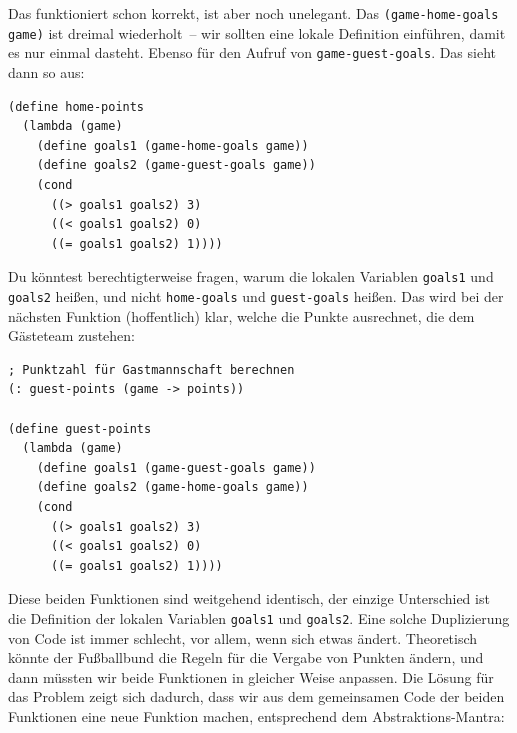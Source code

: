 %
Das funktioniert schon korrekt, ist aber noch unelegant.
Das \lstinline{(game-home-goals game)} ist dreimal wiederholt~-- wir
sollten eine lokale Definition einführen, damit es nur einmal
dasteht.  Ebenso für den Aufruf von \lstinline{game-guest-goals}.  Das
sieht dann so aus:\label{func:home-points}
%
\begin{lstlisting}
(define home-points
  (lambda (game)
    (define goals1 (game-home-goals game))
    (define goals2 (game-guest-goals game))
    (cond
      ((> goals1 goals2) 3)
      ((< goals1 goals2) 0)
      ((= goals1 goals2) 1))))
\end{lstlisting}
%
Du könntest berechtigterweise fragen, warum die lokalen Variablen
\lstinline{goals1} und \lstinline{goals2} heißen, und nicht
\lstinline{home-goals} und \lstinline{guest-goals} heißen.  Das wird
bei der nächsten Funktion (hoffentlich) klar, welche die Punkte
ausrechnet, die dem Gästeteam zustehen:
%
\begin{lstlisting}
; Punktzahl für Gastmannschaft berechnen
(: guest-points (game -> points))

(define guest-points
  (lambda (game)
    (define goals1 (game-guest-goals game))
    (define goals2 (game-home-goals game))
    (cond
      ((> goals1 goals2) 3)
      ((< goals1 goals2) 0)
      ((= goals1 goals2) 1))))
\end{lstlisting}
%
Diese beiden Funktionen sind weitgehend identisch, der einzige
Unterschied ist die Definition der lokalen Variablen
\lstinline{goals1} und \lstinline{goals2}. Eine solche Duplizierung
von Code ist immer schlecht, vor allem, wenn sich etwas
ändert. Theoretisch könnte der Fußballbund die Regeln für die Vergabe
von Punkten ändern, und dann müssten wir beide Funktionen in
gleicher Weise anpassen.  Die Lösung für das Problem zeigt sich
dadurch, dass wir aus dem gemeinsamen Code der beiden Funktionen
eine neue Funktion machen, entsprechend dem Abstraktions-Mantra:

\mantraabstraktion*

